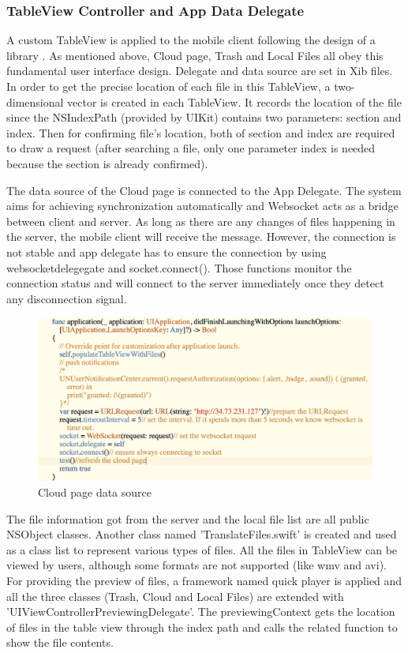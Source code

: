 \documentclass{article}
\begin{document}
\subsubsection{TableView Controller and App Data Delegate}
A custom TableView is applied to the mobile client following the design of a library \cite{c10}. As mentioned above, Cloud page, Trash and Local Files all obey this fundamental user interface design. Delegate and data source are set in Xib files. In order to get the precise location of each file in this TableView, a two-dimensional vector is created in each TableView. It records the location of the file since the NSIndexPath (provided by UIKit) contains two parameters: section and index. Then for confirming file's location, both of section and index are required to draw a request (after searching a file, only one parameter index is needed because the section is already confirmed). 

The data source of the Cloud page is connected to the App Delegate. The system aims for achieving synchronization automatically and Websocket acts as a bridge between client and server. As long as there are any changes of files happening in the server, the mobile client will receive the message. However, the connection is not stable and app delegate has to ensure the connection by using websocketdelegegate and socket.connect(). Those functions monitor the connection status and will connect to the server immediately once they detect any disconnection signal. 

\begin{figure}[H]
\begin{center}
\includegraphics[width=12cm]{29.png}
\end{center}
\caption{Cloud page data source}\label{ex4}
\end{figure}

The file information got from the server and the local file list are all public NSObject classes. Another class named 'TranslateFiles.swift' is created and used as a class list to represent various types of files. All the files in TableView can be viewed by users, although some formats are not supported (like wmv and avi). For providing the preview of files, a framework named quick player is applied and all the three classes (Trash, Cloud and Local Files) are extended with 'UIViewControllerPreviewingDelegate'. The previewingContext gets the location of files in the table view through the index path and calls the related function to show the file contents.
\end{document}
